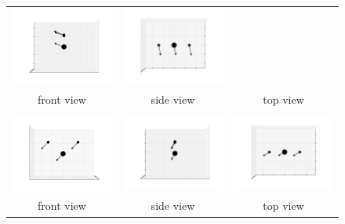\documentclass[11pt]{article}
\begin{document}
\begin{figure}[htp]
\begin{tabular}{|ccc|}
    \includegraphics[width=5.5cm,clip=true,trim=3cm 2cm 3cm 2cm]{images/0-90_1.pdf}&
    \includegraphics[width=5.5cm,clip=true,trim=3cm 2cm 3cm 2cm]{images/90-0_1.pdf}\\front view&side view&top view\\\hline&&\\
    \includegraphics[width=5.5cm,clip=true,trim=3cm 2cm 3cm 2cm]{images/0-0_2.pdf}&
    \includegraphics[width=5.5cm,clip=true,trim=3cm 2cm 3cm 2cm]{images/0-90_2.pdf}&
    \includegraphics[width=5.5cm,clip=true,trim=3cm 2cm 3cm 2cm]{images/90-0_2.pdf}\\front view&side view&top view\\\hline
    \end{tabular}
\end{figure}
\newpage
\end{document}
